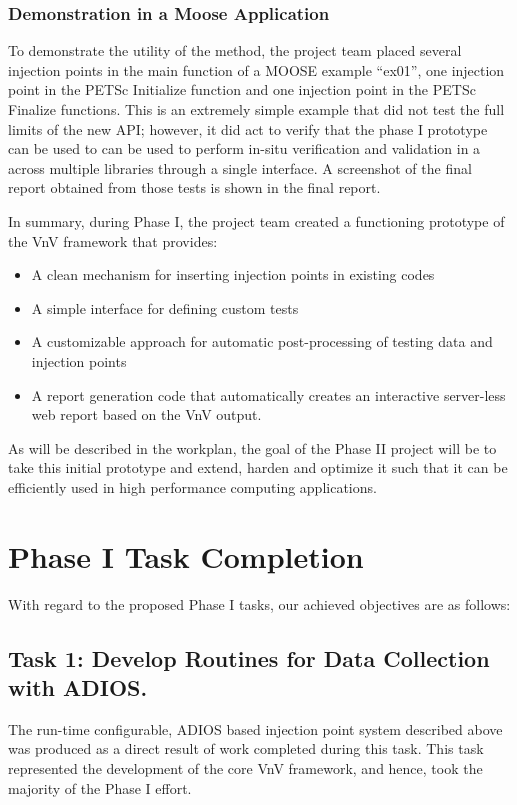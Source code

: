 \subsubsection{ Demonstration in a Moose Application } 
To demonstrate the utility of the method, the project team placed several injection points 
in the main function of a MOOSE example ``ex01'', one injection point in the PETSc Initialize function and 
one injection point in the PETSc Finalize functions. This is an extremely simple example that 
did not test the full limits of the new API; however, it did act to verify that the phase I prototype 
can be used to can be used to perform in-situ verification and validation in a across multiple libraries 
through a single interface. A screenshot of the final \VV report obtained from those tests is shown in the 
final report. 

In summary, during Phase I, the project team created a functioning prototype of the VnV framework that provides:
\begin{itemize}
 \item A clean mechanism for inserting injection points in existing codes
 \item A simple interface for defining custom tests 
 \item A customizable approach for automatic post-processing of testing data and injection points
 \item A report generation code that automatically creates an interactive server-less web report based on the VnV output.
 
\end{itemize}

As will be described in the workplan, the goal of the Phase II project will be to take this initial prototype and extend, harden and 
optimize it such that it can be efficiently used in high performance computing applications. 

\section{Phase I Task Completion}
With regard to the proposed Phase I tasks, our achieved objectives are as 
follows:

\subsection{Task 1: Develop Routines for Data Collection with ADIOS. }

The run-time configurable, ADIOS based injection point system described above was produced as a direct result of work completed
during this task. This task represented the development of the core VnV framework, and hence, took the majority of the Phase I effort. 

